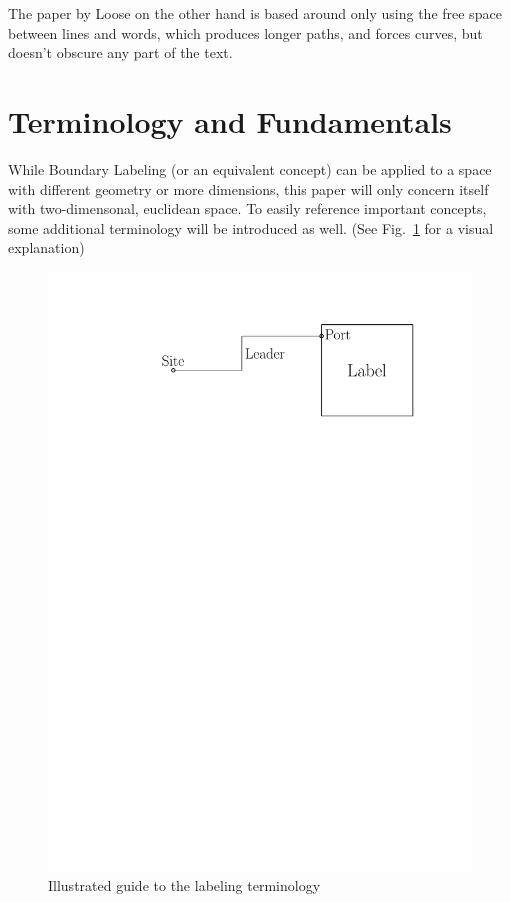 \documentclass[11pt,a4paper]{article}
\begin{document}
The paper by Loose\cite{Loose2015} on the other hand is based around only using the free space between lines and words, which produces longer paths, and forces curves, but doesn't obscure any part of the text.



\section{Terminology and Fundamentals} %
While Boundary Labeling (or an equivalent concept) can be applied to a space with different geometry or more dimensions, this paper will only concern itself with two-dimensonal, euclidean space.
To easily reference important concepts, some additional terminology will be introduced as well. (See Fig.~\ref{fig:term} for a visual explanation)%


\begin{figure}%
 \captionsetup{justification=centering, margin=0.75cm}
 \centering
  \includegraphics[scale=0.5]{IPE_TerminologyDrawing.pdf}
  \caption{Illustrated guide to the labeling terminology}
 \label{fig:term}
\end{figure}
\end{document}

